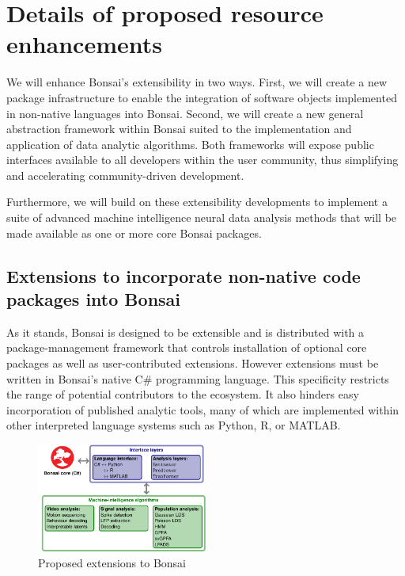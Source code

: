 

\section{Details of proposed resource enhancements}

We will enhance Bonsai's extensibility in two ways.
%
First, we will create a new package infrastructure to enable the integration of software objects implemented in non-native languages into Bonsai.
%
Second, we will create a new general abstraction framework within Bonsai suited to the implementation and application of data analytic algorithms.
%
Both frameworks will expose public interfaces available to all developers within the user community, thus simplifying and accelerating community-driven development.

Furthermore, we will build on these extensibility developments to implement a suite of advanced machine intelligence neural data analysis methods that will be made available as one or more core Bonsai packages.

\subsection{Extensions to incorporate non-native code packages into Bonsai}

As it stands, Bonsai is designed to be extensible and is distributed with a package-management framework that controls installation of optional core packages as well as user-contributed extensions.
%
However extensions must be written in Bonsai's native C\# programming language.
%
This specificity restricts the range of potential contributors to the ecosystem.
%
It also hinders easy incorporation of published analytic tools, many of which are implemented within other interpreted language systems such as Python, R, or MATLAB.  
\begin{figure}
  \includegraphics[width=0.5\textwidth]{figures/extensions.pdf}%
%   
  \caption{Proposed extensions to Bonsai}
  \label{fig:proposedBonsaiExtensions}
\end{figure}

